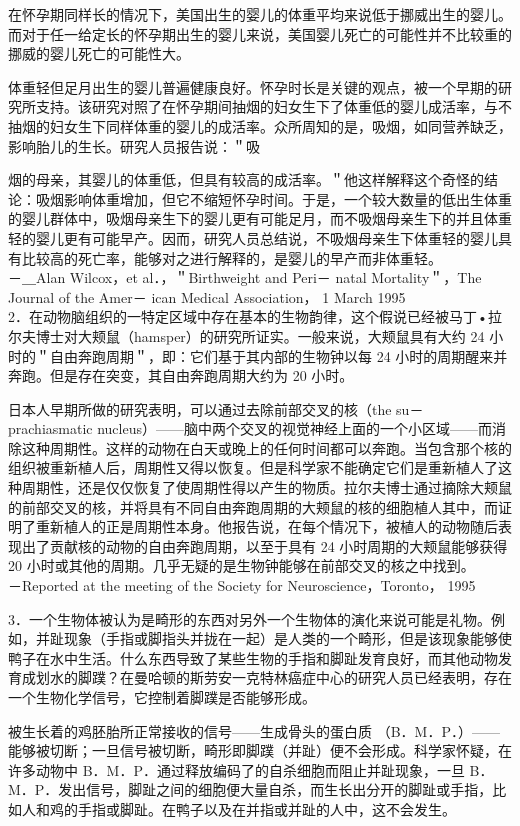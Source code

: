 在怀孕期同样长的情况下，美国出生的婴儿的体重平均来说低于挪威出生的婴儿。而对于任一给定长的怀孕期出生的婴儿来说，美国婴儿死亡的可能性并不比较重的挪威的婴儿死亡的可能性大。

体重轻但足月出生的婴儿普遍健康良好。怀孕时长是关键的观点，被一个早期的研究所支持。该研究对照了在怀孕期间抽烟的妇女生下了体重低的婴儿成活率，与不抽烟的妇女生下同样体重的婴儿的成活率。众所周知的是，吸烟，如同营养缺乏，影响胎儿的生长。研究人员报告说：＂吸

烟的母亲，其婴儿的体重低，但具有较高的成活率。＂他这样解释这个奇怪的结论：吸烟影响体重增加，但它不缩短怀孕时间。于是，一个较大数量的低出生体重的婴儿群体中，吸烟母亲生下的婴儿更有可能足月，而不吸烟母亲生下的并且体重轻的婴儿更有可能早产。因而，研究人员总结说，不吸烟母亲生下体重轻的婴儿具有比较高的死亡率，能够对之进行解释的，是婴儿的早产而非体重轻。\\
－＿Alan Wilcox，et al．，＂Birthweight and Peri－ natal Mortality＂，The Journal of the Amer－ ican Medical Association， 1 March 1995\\
2．在动物脑组织的一特定区域中存在基本的生物韵律，这个假说已经被马丁•拉尔夫博士对大颊鼠（hamsper）的研究所证实。一般来说，大颊鼠具有大约 24 小时的＂自由奔跑周期＂，即：它们基于其内部的生物钟以每 24 小时的周期醒来并奔跑。但是存在突变，其自由奔跑周期大约为 20 小时。

日本人早期所做的研究表明，可以通过去除前部交叉的核（the su－ prachiasmatic nucleus）——脑中两个交叉的视觉神经上面的一个小区域——而消除这种周期性。这样的动物在白天或晚上的任何时间都可以奔跑。当包含那个核的组织被重新植人后，周期性又得以恢复。但是科学家不能确定它们是重新植人了这种周期性，还是仅仅恢复了使周期性得以产生的物质。拉尔夫博士通过摘除大颊鼠的前部交叉的核，并将具有不同自由奔跑周期的大颊鼠的核的细胞植人其中，而证明了重新植人的正是周期性本身。他报告说，在每个情况下，被植人的动物随后表现出了贡献核的动物的自由奔跑周期，以至于具有 24 小时周期的大颊鼠能够获得 20 小时或其他的周期。几乎无疑的是生物钟能够在前部交叉的核之中找到。\\
－Reported at the meeting of the Society for Neuroscience，Toronto， 1995

3．一个生物体被认为是畸形的东西对另外一个生物体的演化来说可能是礼物。例如，并趾现象（手指或脚指头并拢在一起）是人类的一个畸形，但是该现象能够使鸭子在水中生活。什么东西导致了某些生物的手指和脚趾发育良好，而其他动物发育成划水的脚蹼？在曼哈顿的斯劳安一克特林癌症中心的研究人员已经表明，存在一个生物化学信号，它控制着脚蹼是否能够形成。

被生长着的鸡胚胎所正常接收的信号——生成骨头的蛋白质 （B．M．P．）——能够被切断；一旦信号被切断，畸形即脚蹼（并趾）便不会形成。科学家怀疑，在许多动物中 B．M．P．通过释放编码了的自杀细胞而阻止并趾现象，一旦 B．M．P．发出信号，脚趾之间的细胞便大量自杀，而生长出分开的脚趾或手指，比如人和鸡的手指或脚趾。在鸭子以及在并指或并趾的人中，这不会发生。

